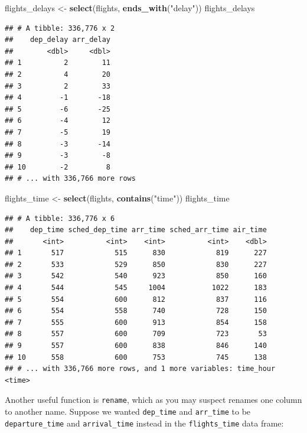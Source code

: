 \documentclass[]{tufte-book}
\newenvironment{Shaded}{\begin{snugshade}}{\end{snugshade}}
\newcommand{\KeywordTok}[1]{\textcolor[rgb]{0.13,0.29,0.53}{\textbf{{#1}}}}
\newcommand{\StringTok}[1]{\textcolor[rgb]{0.31,0.60,0.02}{{#1}}}
\newcommand{\NormalTok}[1]{{#1}}
\begin{document}
\begin{Shaded}
\begin{Highlighting}[]
\NormalTok{flights_delays <-}\StringTok{ }\KeywordTok{select}\NormalTok{(flights, }\KeywordTok{ends_with}\NormalTok{(}\StringTok{"delay"}\NormalTok{))}
\NormalTok{flights_delays}
\end{Highlighting}
\end{Shaded}

\begin{verbatim}
## # A tibble: 336,776 x 2
##    dep_delay arr_delay
##        <dbl>     <dbl>
## 1          2        11
## 2          4        20
## 3          2        33
## 4         -1       -18
## 5         -6       -25
## 6         -4        12
## 7         -5        19
## 8         -3       -14
## 9         -3        -8
## 10        -2         8
## # ... with 336,766 more rows
\end{verbatim}

\begin{Shaded}
\begin{Highlighting}[]
\NormalTok{flights_time <-}\StringTok{ }\KeywordTok{select}\NormalTok{(flights, }\KeywordTok{contains}\NormalTok{(}\StringTok{"time"}\NormalTok{))}
\NormalTok{flights_time}
\end{Highlighting}
\end{Shaded}

\begin{verbatim}
## # A tibble: 336,776 x 6
##    dep_time sched_dep_time arr_time sched_arr_time air_time
##       <int>          <int>    <int>          <int>    <dbl>
## 1       517            515      830            819      227
## 2       533            529      850            830      227
## 3       542            540      923            850      160
## 4       544            545     1004           1022      183
## 5       554            600      812            837      116
## 6       554            558      740            728      150
## 7       555            600      913            854      158
## 8       557            600      709            723       53
## 9       557            600      838            846      140
## 10      558            600      753            745      138
## # ... with 336,766 more rows, and 1 more variables: time_hour <time>
\end{verbatim}

Another useful function is \texttt{rename}, which as you may suspect
renames one column to another name. Suppose we wanted \texttt{dep\_time}
and \texttt{arr\_time} to be \texttt{departure\_time} and
\texttt{arrival\_time} instead in the \texttt{flights\_time} data frame:
\end{document}
